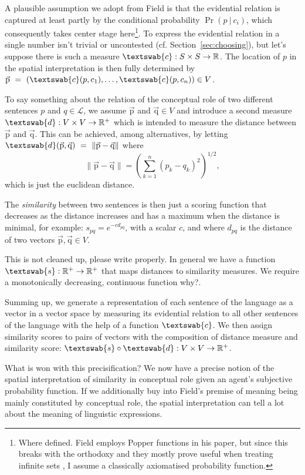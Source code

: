 \documentclass[11pt, a4paper]{scrartcl}
\renewcommand{\i}[1]{\emph{#1}}
\renewcommand{\L}{\mathcal{L}}
\renewcommand{\v}[1]{\vec{\mathrm{#1}}}
\newcommand{\m}[1]{\textswab{#1}}
\newcommand{\given}[1][]{\:#1\vert\:}
\begin{document}
A plausible assumption we adopt from Field is that the evidential relation is captured at least partly by the conditional probability $\Pr(p \given c_i)$, which consequently takes center stage here\footnote{Where defined. Field employs Popper functions in his paper, but since this breaks with the orthodoxy and they mostly prove useful when treating infinite sets \parencite[1352]{Leitgeb2013-LEIRBS}, I assume a classically axiomatised probability function.}. To express the evidential relation in a single number isn't trivial or uncontested (cf. Section~\ref{sec:choosing}), but let's suppose there is such a measure $\m{c}: S \times S \rightarrow \mathbb{R}$. The location of $p$ in the spatial interpretation is then fully determined by $\v{p}~=~(\m{c}({p, c_1}),\dots, \m{c}(p, c_n)) \in V$.

To say something about the relation of the conceptual role of two different sentences $p$ and $q \in \L$, we assume $\v{p}$ and $\v{q} \in V$ and introduce a second measure $\m{d}: V \times V \rightarrow \mathbb{R}^+$ which is intended to measure the distance between $\v{p}$ and $\v{q}$. This can be achieved, among alternatives, by letting ${\m{d}(\v{p}, \v{q})~=~\lVert \v{p} - \v{q} \rVert}$ where 
\[
    \lVert \v{p}-\v{q} \rVert = {\left( \sum_{k=1}^n {(p_k-q_k)}^2 \right)}^{1/2}, 
\]
which is just the euclidean distance. 

The \i{similarity} between two sentences is then just a scoring function that decreases as the distance increases and has a maximum when the distance is minimal, for example: $s_{pq} = e^{-cd_{pq}}$, with a scalar $c$, and where $d_{pq}$ is the distance of two vectors $\v{p}, \v{q} \in V$. 

{\color{red}This is not cleaned up, please write properly.}
In general we have a function ${\m{s}: \mathbb{R}^+ \rightarrow \mathbb{R}^+ }$ that maps distances to similarity measures. We require a monotonically decreasing, continuous function {\color{red} why?}. 

Summing up, we generate a representation of each sentence of the language as a vector in a vector space by measuring its evidential relation to all other sentences of the language with the help of a function $\m{c}$. We then assign similarity scores to pairs of vectors with the composition of distance measure and similarity score: ${\m{s}\circ \m{d} : V \times V \rightarrow \mathbb{R}^+}$.

What is won with this precisification? We now have a precise notion of the spatial interpretation of similarity in conceptual role given an agent's subjective probability function. If we additionally buy into Field's premise of meaning being mainly constituted by conceptual role, the spatial interpretation can tell a lot about the meaning of linguistic expressions. 
\end{document}

